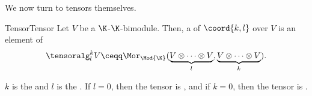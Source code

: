 We now turn to tensors themselves.
\begin{dfn}{Tensor}{Tensor}
	Let $V$ be a $\K$-$\K$-bimodule.  Then, a  of  $\coord{k,l}$ over $V$ is an element of
	\begin{equation}\label{eqn5.4.2}
	\tensoralg _l^kV\ceqq \Mor _{\Mod{\K}}(\underbrace{V\otimes \cdots \otimes V}_l,\underbrace{V\otimes \cdots \otimes V}_k).
	\end{equation}
	\begin{rmk}
		$k$ is the  and $l$ is the .  If $l=0$, then the tensor is , and if $k=0$, then the tensor is .
		

\end{rmk}
\end{dfn}
